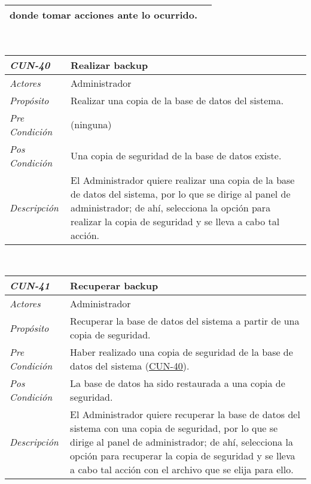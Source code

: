 \begin{center}
{\begin{tabular}{ | p{3cm} | p{12.5cm} | }
	donde tomar acciones ante lo ocurrido. \\
	\hline
\end{tabular}} \\[1cm]
\hypertarget{CUN-40}{%
\begin{tabular}{ | p{3cm} | p{12.5cm} | }
	\hline
	\rowcolor{lightgray}
	\hfil \textbf{\textit{CUN-40}} &
	\hfil \textbf{Realizar backup} \\
	\hline
	\raggedleft \textit{Actores} & Administrador \\
	\hline
	\raggedleft \textit{Prop\'osito} & Realizar una
	copia de la base de datos del sistema. \\
	\hline
	\raggedleft \textit{Pre Condici\'on} & (ninguna) \\
	\hline
	\raggedleft \textit{Pos Condici\'on} & Una copia de
	seguridad de la base de datos existe. \\
	\hline
	\raggedleft \textit{Descripci\'on} &
	El Administrador quiere realizar una copia de la
	base de datos del sistema, por lo que se dirige al
	panel de administrador; de ah\'i, selecciona la
	opci\'on para realizar la copia de seguridad y se
	lleva a cabo tal acci\'on. \\
	\hline
\end{tabular}} \\[1cm]
\hypertarget{CUN-41}{%
\begin{tabular}{ | p{3cm} | p{12.5cm} | }
	\hline
	\rowcolor{lightgray}
	\hfil \textbf{\textit{CUN-41}} &
	\hfil \textbf{Recuperar backup} \\
	\hline
	\raggedleft \textit{Actores} & Administrador \\
	\hline
	\raggedleft \textit{Prop\'osito} & Recuperar la
	base de datos del sistema a partir de una copia de
	seguridad. \\
	\hline
	\raggedleft \textit{Pre Condici\'on} & Haber
	realizado una copia de seguridad de la base de datos
	del sistema (\hyperlink{CUN-40}{CUN-40}). \\
	\hline
	\raggedleft \textit{Pos Condici\'on} & La base de
	datos ha sido restaurada a una copia de seguridad. \\
	\hline
	\raggedleft \textit{Descripci\'on} &
	El Administrador quiere recuperar la base de datos
	del sistema con una copia de seguridad, por lo que
	se dirige al panel de administrador; de ah\'i,
	selecciona la opci\'on para recuperar la copia de
	seguridad y se lleva a cabo tal acci\'on con el
	archivo que se elija para ello. \\
	\hline
\end{tabular}}
\end{center}
